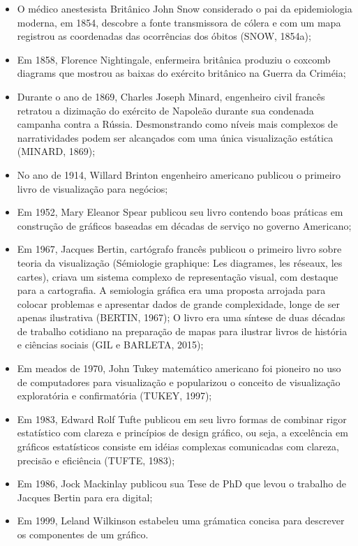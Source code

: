 \begin{itemize}
\item O médico anestesista Britânico John Snow considerado o pai da epidemiologia moderna, em 1854, descobre a fonte transmissora de cólera e com um mapa registrou as coordenadas das ocorrências dos óbitos (SNOW, 1854a);
\item Em 1858, Florence Nightingale, enfermeira britânica produziu o coxcomb diagrams que mostrou as baixas do exército britânico na Guerra da Criméia;
\item Durante o ano de 1869, Charles Joseph Minard, engenheiro civil francês retratou a dizimação do exército de Napoleão durante sua condenada campanha contra a Rússia. Desmonstrando como níveis mais complexos de narratividades podem ser alcançados com uma única visualização estática (MINARD, 1869);
\item No ano de 1914, Willard Brinton engenheiro americano publicou o primeiro livro de visualização para negócios;
\item Em 1952, Mary Eleanor Spear publicou seu livro contendo boas práticas em construção de gráficos baseadas em décadas de serviço no governo Ame\-ricano;
\item Em 1967, Jacques Bertin, cartógrafo francês publicou o primeiro livro sobre teoria da visualização (Sémiologie graphique: Les diagrames, les réseaux, les cartes), criava um sistema complexo de representação visual, com des\-taque para a cartografia. A semiologia gráfica era uma proposta arrojada para colocar problemas e apresentar dados de grande complexidade, longe de ser apenas ilustrativa (BERTIN, 1967); O livro era uma síntese de duas décadas de trabalho cotidiano na preparação de mapas para ilustrar livros de história e ciências sociais (GIL e BARLETA, 2015);
\item Em meados de 1970, John Tukey matemático americano foi pioneiro no uso de computadores para visualização e popularizou o conceito de visualização exploratória e confirmatória (TUKEY, 1997);
\item Em 1983, Edward Rolf Tufte publicou em seu livro formas de combinar rigor estatístico com clareza e princípios de design gráfico, ou seja, a excelência em gráficos estatísticos consiste em idéias complexas comunicadas com clareza, precisão e eficiência (TUFTE, 1983);
\item Em 1986, Jock Mackinlay publicou sua Tese de PhD que levou o trabalho de Jacques Bertin para era digital;
\item Em 1999, Leland Wilkinson estabeleu uma grámatica concisa para descrever os componentes de um gráfico.
\end{itemize}

